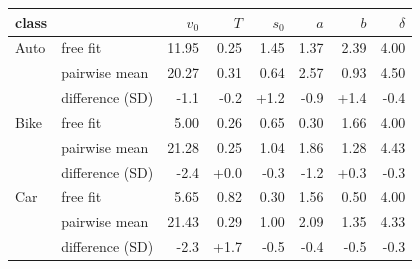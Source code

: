 \begin{tabular}{@{}llrrrrrr@{}}\toprule
class & & $v_0$ & $T$ & $s_0$ & $a$ & $b$ & $\delta$\\\midrule
Auto & free fit & 11.95 & 0.25 & 1.45 & 1.37 & 2.39 & 4.00\\
 & pairwise mean & 20.27 & 0.31 & 0.64 & 2.57 & 0.93 & 4.50\\
 & difference (SD) & -1.1 & -0.2 & +1.2 & -0.9 & +1.4 & -0.4\\
\midrule
Bike & free fit & 5.00 & 0.26 & 0.65 & 0.30 & 1.66 & 4.00\\
 & pairwise mean & 21.28 & 0.25 & 1.04 & 1.86 & 1.28 & 4.43\\
 & difference (SD) & -2.4 & +0.0 & -0.3 & -1.2 & +0.3 & -0.3\\
\midrule
Car & free fit & 5.65 & 0.82 & 0.30 & 1.56 & 0.50 & 4.00\\
 & pairwise mean & 21.43 & 0.29 & 1.00 & 2.09 & 1.35 & 4.33\\
 & difference (SD) & -2.3 & +1.7 & -0.5 & -0.4 & -0.5 & -0.3\\
\bottomrule\end{tabular}
